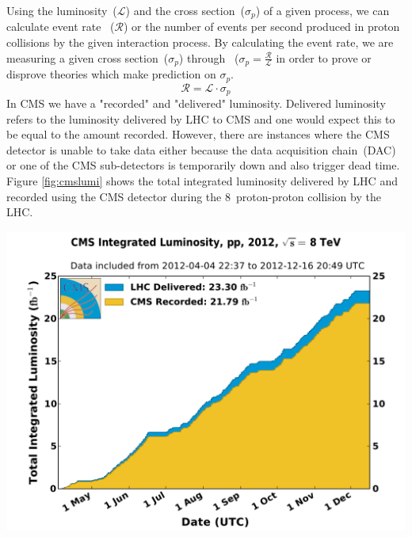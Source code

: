 Using the luminosity~($\mathscr{L}$) and the cross section~($\sigma_{p}$) of a given process, we can calculate
event rate ~($\mathscr{R}$) or the number of events per second produced in proton collisions by the given interaction process.
By calculating the event rate, we are measuring a given cross section~($\sigma_{p}$) through ~($\sigma_{p} = \frac{\mathscr{R}}{\mathscr{L}}$ in order to prove or disprove theories which make prediction on $\sigma_{p}$.
\begin{equation}
\mathscr{R} = \mathscr{L} \cdot \sigma_{p}
\end{equation}
In CMS we have a "recorded" and "delivered" luminosity. Delivered luminosity refers to the luminosity delivered by LHC to CMS and one would expect this to be equal to  the amount recorded. However, there are instances where the CMS detector is unable to take data either because the data acquisition chain~(DAC) or one of the CMS sub-detectors is temporarily down and also trigger dead time.%
 Figure \ref{fig:cmslumi} shows the total integrated luminosity delivered by LHC and recorded using the CMS detector during the $8$~\TeV proton-proton collision by the LHC.
\begin{center}
\centering
\mbox{\includegraphics[scale=0.5]{THESISPLOTS/int_lumi_per_day_cumulative_pp_2012.pdf}
}
\label{fig:cmslumi}
\end{center}

